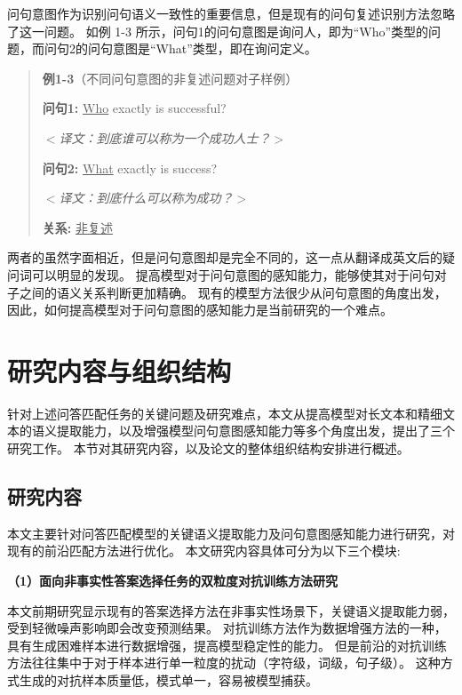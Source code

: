问句意图作为识别问句语义一致性的重要信息，但是现有的问句复述识别方法忽略了这一问题。
如例 1-3 所示，问句1的问句意图是询问人，即为“Who”类型的问题，而问句2的问句意图是“What”类型，即在询问定义。
\begin{quotation}
    \noindent \textbf{\songti 例1-3}（不同问句意图的非复述问题对子样例）
    
    \noindent \textbf{问句1:} \underline{Who} exactly is successful?

    \noindent $<$\textit{译文：到底谁可以称为一个成功人士？}$>$
    
    \noindent \textbf{问句2:}  \underline{What} exactly is success?

    \noindent $<$\textit{译文：到底什么可以称为成功？}$>$
    
    \noindent \textbf{关系:} \underline{非复述}
    
\end{quotation}

两者的虽然字面相近，但是问句意图却是完全不同的，这一点从翻译成英文后的疑问词可以明显的发现。
提高模型对于问句意图的感知能力，能够使其对于问句对子之间的语义关系判断更加精确。
现有的模型方法很少从问句意图的角度出发，因此，如何提高模型对于问句意图的感知能力是当前研究的一个难点。


\section{研究内容与组织结构}

针对上述问答匹配任务的关键问题及研究难点，本文从提高模型对长文本和精细文本的语义提取能力，以及增强模型问句意图感知能力等多个角度出发，提出了三个研究工作。
本节对其研究内容，以及论文的整体组织结构安排进行概述。

\subsection{研究内容}

本文主要针对问答匹配模型的关键语义提取能力及问句意图感知能力进行研究，对现有的前沿匹配方法进行优化。
本文研究内容具体可分为以下三个模块:

\textbf{\songti （1）面向非事实性答案选择任务的双粒度对抗训练方法研究}

本文前期研究显示现有的答案选择方法在非事实性场景下，关键语义提取能力弱，受到轻微噪声影响即会改变预测结果。
对抗训练方法作为数据增强方法的一种，具有生成困难样本进行数据增强，提高模型稳定性的能力。
但是前沿的对抗训练方法往往集中于对于样本进行单一粒度的扰动（字符级，词级，句子级）。%
这种方式生成的对抗样本质量低，模式单一，容易被模型捕获。

